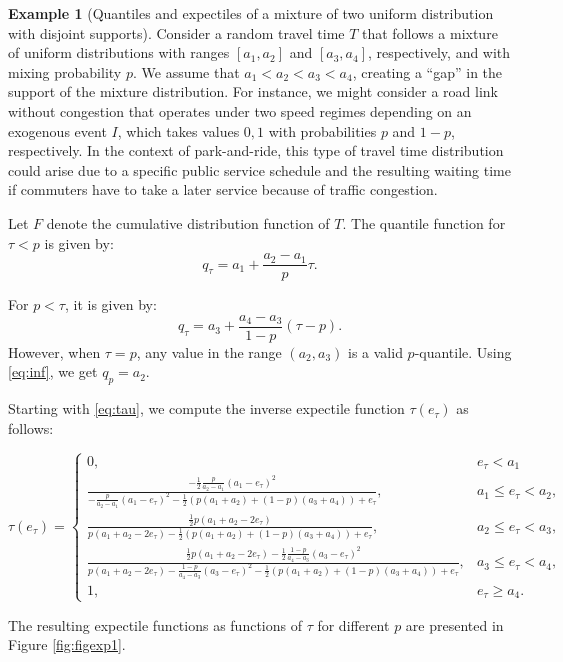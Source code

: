 \documentclass[preprint, 3p, authoryear]{elsarticle} %
\theoremstyle{definition}
\theoremstyle{definition}
\newtheorem{example}{Example}[section]
\theoremstyle{definition}
\theoremstyle{definition}
\theoremstyle{remark}
\begin{document}
\begin{example}[Quantiles and expectiles of a mixture of two uniform distribution with disjoint supports]
\protect\hypertarget{exm:duqande}{}\label{exm:duqande}Consider a random travel time \(T\) that follows a mixture of uniform distributions with ranges \([a_1,a_2]\) and \([a_3,a_4]\), respectively, and with mixing probability \(p\). We assume that \(a_1<a_2<a_3<a_4\), creating a ``gap'' in the support of the mixture distribution. For instance, we might consider a road link without congestion that operates under two speed regimes depending on an exogenous event \(I\), which takes values \({0,1}\) with probabilities \(p\) and \(1-p\), respectively. In the context of park-and-ride, this type of travel time distribution could arise due to a specific public service schedule and the resulting waiting time if commuters have to take a later service because of traffic congestion.

Let \(F\) denote the cumulative distribution function of \(T\). The quantile function for \(\tau <p\) is given by:
\[q_\tau = a_1 + \frac{a_2-a_1} p\tau.\]

For \(p<\tau\), it is given by:
\[q_\tau = a_3 + \frac{a_4-a_3}{1-p}(\tau-p).\]
However, when \(\tau=p\), any value in the range \((a_2,a_3)\) is a valid \(p\)-quantile. Using \eqref{eq:inf}, we get \(q_p=a_2\).

Starting with \eqref{eq:tau}, we compute the inverse expectile function \(\tau(e_\tau)\) as follows:

\[
\tau(e_\tau)=\begin{cases}
0, &e_\tau<a_1\\
\frac{-\frac 12 \frac{p}{a_2-a_1}(a_1-e_\tau)^2}{-\frac{p}{a_2-a_1}(a_1-e_\tau)^2    -\frac 12(p(a_1+a_2) + (1-p)(a_3+a_4)) + e_\tau}, & a_1\leq e_\tau<a_2,\\
\frac{\frac 12p\left(a_1 + a_2 - 2e_\tau\right)}{p\left(a_1 + a_2 - 2e_\tau\right)  -\frac 12(p(a_1+a_2) + (1-p)(a_3+a_4)) + e_\tau}, & a_2\leq e_\tau<a_3,\\
\frac{\frac 12 p\left(a_1 + a_2 - 2e_\tau\right)-\frac 12 \frac{1-p}{a_4-a_3}(a_3-e_\tau)^2}{p\left(a_1 + a_2 - 2e_\tau\right)-\frac{1-p}{a_4-a_3}(a_3-e_\tau)^2   -\frac 12(p(a_1+a_2) + (1-p)(a_3+a_4)) + e_\tau}, & a_3\leq e_\tau<a_4,\\
1, &e_\tau\geq a_4.
\end{cases}\]

The resulting expectile functions as functions of \(\tau\) for different \(p\) are presented in Figure \ref{fig:figexp1}.


\end{example}
\end{document}
